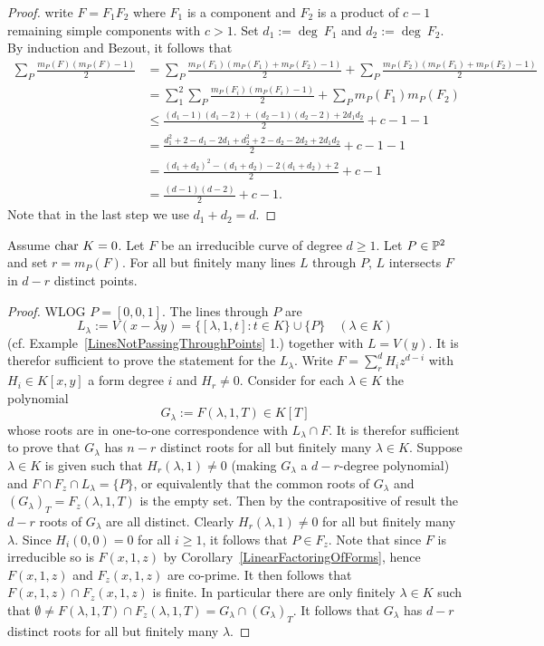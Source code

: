      \begin{proof}
        write $F=F_1F_2$ where $F_1$ is a component and $F_2$ is a product of $c-1$ remaining simple components with $c>1$. Set $d_1:= \deg\ F_1$ and $d_2:= \deg \ F_2$. By induction and Bezout, it follows that
         \begin{align*}
             \sum_P \frac{m_P(F)(m_P(F)-1)}{2} &= \sum_P \frac{m_P(F_1)(m_P(F_1)+m_P(F_2)-1)}{2} + \sum_P \frac{m_P(F_2)(m_P(F_1)+m_P(F_2)-1)}{2}\\
             &= \sum_1^2\sum_P \frac{m_P(F_i)(m_P(F_i)-1)}{2}+ \sum_P m_P(F_1)m_P(F_2)\\
             &\leq \frac{(d_1-1)(d_1-2)+(d_2-1)(d_2-2)+2d_1d_2}{2} +c-1-1\\
             &= \frac{d_1^2+2-d_1-2d_1+d_2^2+2-d_2-2d_2+2d_1d_2}{2}+c-1-1\\
             &=\frac{(d_1+d_2)^2-(d_1+d_2)-2(d_1+d_2)+2}{2}+c-1\\
             &= \frac{(d-1)(d-2)}{2}+c-1.
         \end{align*}
         Note that in the last step we use $d_1+d_2=d$.
     \end{proof}
     \begin{proposition}
         Assume $\mathrm{char} \ K=0$. Let $F$ be an irreducible curve of degree $d\geq 1$. Let $P\in \mathbb{P}^2$ and set $r=m_P(F)$. For all but finitely many lines $L$ through $P$, $L$ intersects $F$ in $d-r$ distinct points.
     \end{proposition}
     \begin{proof}
         WLOG $P=[0,0,1]$. The lines through $P$ are 
         $$L_\lambda := V(x-\lambda y)= \{[\lambda, 1, t] : t\in K\}\cup \{P\} \quad (\lambda\in K)$$
         (cf. Example~\ref{LinesNotPassingThroughPoints} 1.)
         together with $L = V(y)$. It is therefor sufficient to prove the statement for the $L_\lambda$. Write $F=\sum_r^d H_iz^{d-i}$ with $H_i\in K[x,y]$ a form degree $i$ and $H_r\neq 0$. Consider for each $\lambda \in K$ the polynomial 
         $$G_\lambda := F(\lambda,1,T)\in K[T]$$
         whose roots are in one-to-one correspondence with $L_\lambda \cap F$. It is therefor sufficient to prove that $G_\lambda$ has $n-r$ distinct roots for all but finitely many $\lambda \in K$. Suppose $\lambda\in K$ is given such that $H_r(\lambda,1)\neq 0$ (making $G_\lambda$ a $d-r$-degree polynomial) and $F\cap F_z \cap L_\lambda = \{P\}$, or equivalently that the common roots of $G_\lambda$ and $(G_\lambda)_T=F_z(\lambda,1,T)$ is the empty set. Then by the contrapositive of {\Large result} the $d-r$ roots of $G_\lambda$ are all distinct. Clearly $H_r(\lambda,1)\neq 0$ for all but finitely many $\lambda$. Since $H_i(0,0)=0$ for all $i\geq 1$, it follows that $P \in F_z$. Note that since $F$ is irreducible so is $F(x,1,z)$ by Corollary~\ref{LinearFactoringOfForms}, hence $F(x,1,z)$ and $F_z(x,1,z)$ are co-prime. It then follows that $F(x,1,z)\cap F_z(x,1,z)$ is finite. In particular there are only finitely $\lambda\in K$ such that $\emptyset \neq F(\lambda,1,T) \cap F_z(\lambda,1,T) = G_\lambda \cap (G_\lambda)_T$. It follows that $G_\lambda $ has $d-r$ distinct roots for all but finitely many $\lambda$.
     \end{proof}
